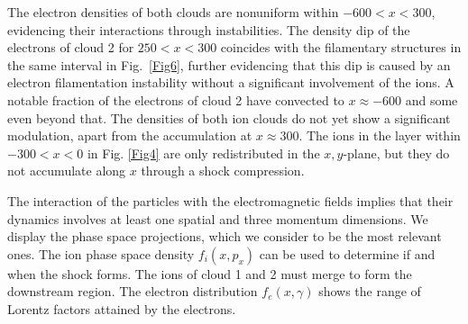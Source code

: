 \documentclass[structabstract]{aa}
\begin{document}
The electron densities of both clouds are nonuniform within $-600 < x < 300$,
evidencing their interactions through instabilities. The density dip of
the electrons of cloud 2 for $250 < x < 300$ coincides with the filamentary 
structures in the same interval in Fig.~\ref{Fig6}, further evidencing that 
this dip is caused by an electron filamentation instability without a
significant involvement of the ions. A notable fraction of the electrons of 
cloud 2 have 
convected to $x\approx -600$ and some even beyond that. The densities of 
both ion clouds do not yet show a significant modulation, apart from the 
accumulation at $x\approx 300$. The ions in the layer within $-300 < x < 0$ 
in Fig. \ref{Fig4} are only redistributed in the $x,y$-plane, but they do 
not accumulate along $x$ through a shock compression. 

The interaction of the particles with the electromagnetic fields implies
that their dynamics involves at least one spatial and three momentum
dimensions. We display the phase space projections, which we consider to
be the most relevant ones. The ion phase space density $f_i (x,p_x)$ can be 
used to determine if and when the shock forms. The ions of cloud 1 and 2 
must merge to form the downstream region. The electron distribution  
$f_e (x,\gamma)$ shows the range of Lorentz factors attained by the electrons.
\end{document}
